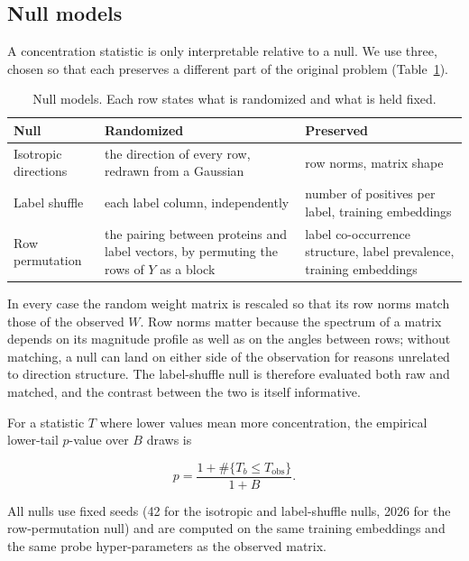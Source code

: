 \documentclass[11pt,a4paper]{article}
\begin{document}
\subsection{Null models}
\label{sec:nulls}

A concentration statistic is only interpretable relative to a null. We use three,
chosen so that each preserves a different part of the original problem
(Table~\ref{tab:nulls}).

\begin{table}[H]
\centering
\caption{Null models. Each row states what is randomized and what is held fixed.}
\label{tab:nulls}
\begin{tabularx}{\textwidth}{@{}lXX@{}}
\toprule
Null & Randomized & Preserved \\
\midrule
Isotropic directions & the direction of every row, redrawn from a Gaussian &
row norms, matrix shape \\
Label shuffle & each label column, independently & number of positives per label,
training embeddings \\
Row permutation & the pairing between proteins and label vectors, by permuting the
rows of $Y$ as a block & label co-occurrence structure, label prevalence,
training embeddings \\
\bottomrule
\end{tabularx}
\end{table}

In every case the random weight matrix is rescaled so that its row norms match
those of the observed $W$. Row norms matter because the spectrum of a matrix
depends on its magnitude profile as well as on the angles between rows; without
matching, a null can land on either side of the observation for reasons unrelated
to direction structure. The label-shuffle null is therefore evaluated both raw and
matched, and the contrast between the two is itself informative.

For a statistic $T$ where lower values mean more concentration, the empirical
lower-tail $p$-value over $B$ draws is

\begin{equation}
p = \frac{1 + \#\{T_b \leq T_{\text{obs}}\}}{1 + B}.
\end{equation}

All nulls use fixed seeds (42 for the isotropic and label-shuffle nulls, 2026 for
the row-permutation null) and are computed on the same training embeddings and the
same probe hyper-parameters as the observed matrix.
\end{document}
